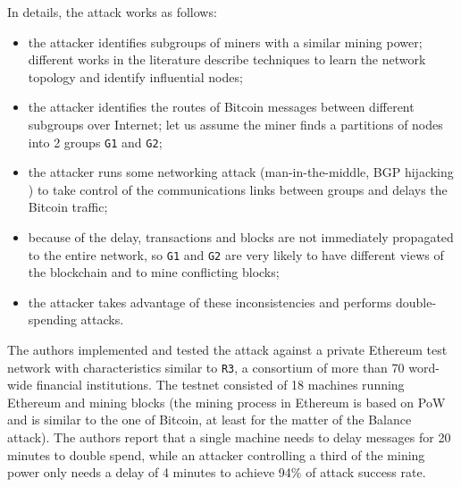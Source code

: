 In details, the attack works as follows:
\begin{itemize}
	\item the attacker identifies subgroups of miners with a similar mining power; different works in the literature \cite{deanonymization_2014, discovering_influential_nodes_2014} describe techniques to learn the network topology and identify influential nodes;
	\item the attacker identifies the routes of Bitcoin messages between different subgroups over Internet; let us assume the miner finds a partitions of nodes into \num{2} groups \texttt{G1} and \texttt{G2};
	\item the attacker runs some networking attack (man-in-the-middle, BGP hijacking \cite{bgp_hijacking_secureworks}) to take control of the communications links between groups and delays the Bitcoin traffic;
	\item because of the delay, transactions and blocks are not immediately propagated to the entire network, so \texttt{G1} and \texttt{G2} are very likely to have different views of the blockchain and to mine conflicting blocks;
	\item the attacker takes advantage of these inconsistencies and performs double-spending attacks.
\end{itemize}

The authors implemented and tested the attack against a private Ethereum test network with characteristics similar to \texttt{R3}, a consortium of more than \num{70} word-wide financial institutions.
The testnet consisted of \num{18} machines running Ethereum and mining blocks (the mining process in Ethereum is based on \ac{PoW} and is similar to the one of Bitcoin, at least for the matter of the Balance attack).
The authors report that a single machine needs to delay messages for \num{20} minutes to double spend, while an attacker controlling a third of the mining power only needs a delay of \num{4} minutes to achieve \num{94}\% of attack success rate.
